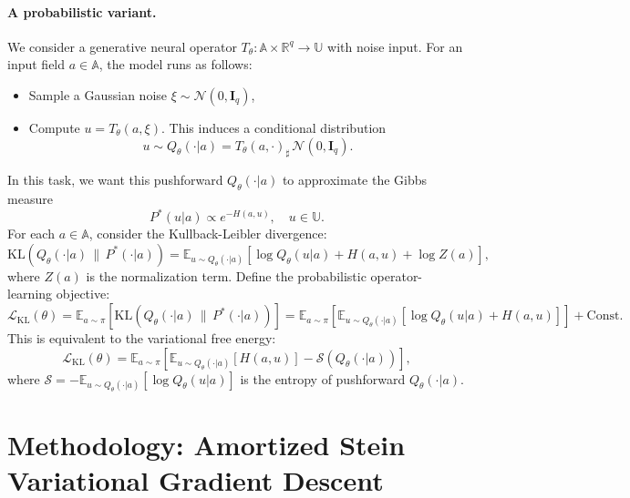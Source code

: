 \documentclass[11pt]{article}
\newcommand{\bbR}{\mathbb{R}}
\newcommand{\bbE}{\mathbb{E}}
\begin{document}
\paragraph{A probabilistic variant.} We consider a generative neural operator $T_\theta:\mathbb{A}\times\bbR^q\to\mathbb{U}$ with noise input. For an input field $a\in\mathbb{A}$, the model runs as follows: \vspace{-0.2cm}
\begin{itemize}[itemsep=-2pt]
    \item Sample a Gaussian noise $\xi\sim\mathcal{N}(0,\mathbf{I}_q)$,
    \item Compute $u=T_\theta(a,\xi)$. This induces a conditional distribution
    \begin{equation*}
        u\sim Q_\theta(\cdot|a)=T_\theta(a,\cdot)_\sharp\,\mathcal{N}(0,\mathbf{I}_q).
    \end{equation*}
\end{itemize}
In this task, we want this pushforward $Q_\theta(\cdot|a)$ to approximate the Gibbs measure
\begin{equation*}
P^*(u|a)\propto e^{-H(a,u)},\quad u\in\mathbb{U}.
\end{equation*}
For each $a\in\mathbb{A}$, consider the Kullback-Leibler divergence:
\begin{equation*}
\mathrm{KL}\left(Q_\theta(\cdot|a)\,\|\,P^*(\cdot|a)\right)=\bbE_{u\sim Q_\theta(\cdot|a)}\left[\log Q_\theta(u|a)+H(a,u)+\log Z(a)\right],
\end{equation*}
where $Z(a)$ is the normalization term. Define the probabilistic operator-learning objective:
\begin{equation*}
    \mathcal{L}_{\mathrm{KL}}(\theta)=\bbE_{a\sim\pi}\left[\mathrm{KL}\left(Q_\theta(\cdot|a)\,\|\,P^*(\cdot|a)\right)\right]=\bbE_{a\sim\pi}\left[\bbE_{u\sim Q_\theta(\cdot|a)}\left[\log Q_\theta(u|a)+H(a,u)\right]\right]+\mathrm{Const}.
\end{equation*}
This is equivalent to the variational free energy:
\begin{equation*}
    \mathcal{L}_{\mathrm{KL}}(\theta)=\bbE_{a\sim\pi}\left[\bbE_{u\sim Q_\theta(\cdot|a)}\left[H(a,u)\right]-\mathcal{S}(Q_\theta(\cdot|a))\right],
\end{equation*}
where $\mathcal{S}=-\bbE_{u\sim Q_\theta(\cdot|a)}\left[\log Q_\theta(u|a)\right]$ is the entropy of pushforward $Q_\theta(\cdot|a)$.

\section{Methodology: Amortized Stein Variational Gradient Descent}
\end{document}
